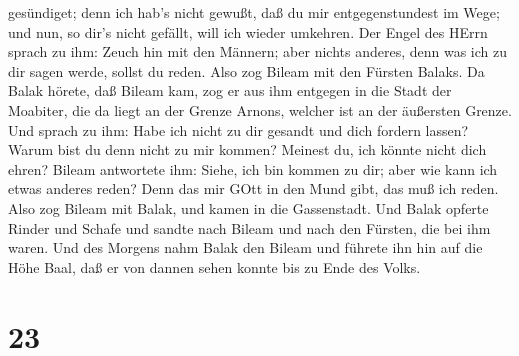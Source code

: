 gesündiget; denn ich hab's nicht gewußt, daß du mir entgegenstundest im
Wege; und nun, so dir's nicht gefällt, will ich wieder umkehren.
 Der Engel des HErrn sprach zu ihm: Zeuch hin mit den
Männern; aber nichts anderes, denn was ich zu dir sagen werde, sollst du
reden. Also zog Bileam mit den Fürsten Balaks.  Da Balak
hörete, daß Bileam kam, zog er aus ihm entgegen in die Stadt der
Moabiter, die da liegt an der Grenze Arnons, welcher ist an der
äußersten Grenze.  Und sprach zu ihm: Habe ich nicht zu dir
gesandt und dich fordern lassen? Warum bist du denn nicht zu mir kommen?
Meinest du, ich könnte nicht dich ehren?  Bileam antwortete
ihm: Siehe, ich bin kommen zu dir; aber wie kann ich etwas anderes
reden? Denn das mir GOtt in den Mund gibt, das muß ich reden.
 Also zog Bileam mit Balak, und kamen in die Gassenstadt.
 Und Balak opferte Rinder und Schafe und sandte nach Bileam
und nach den Fürsten, die bei ihm waren.  Und des Morgens
nahm Balak den Bileam und führete ihn hin auf die Höhe Baal, daß er von
dannen sehen konnte bis zu Ende des Volks.

\hypertarget{section-22}{%
\section{23}\label{section-22}}

